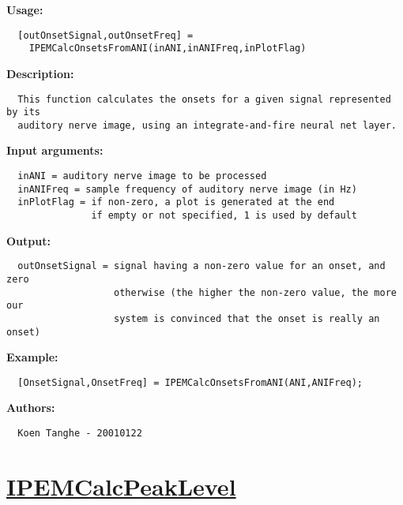 \textbf{Usage:}
\begin{verbatim}  [outOnsetSignal,outOnsetFreq] =
    IPEMCalcOnsetsFromANI(inANI,inANIFreq,inPlotFlag)

\end{verbatim}
\textbf{Description:}
\begin{verbatim}  This function calculates the onsets for a given signal represented by its 
  auditory nerve image, using an integrate-and-fire neural net layer.

\end{verbatim}
\textbf{Input arguments:}
\begin{verbatim}  inANI = auditory nerve image to be processed
  inANIFreq = sample frequency of auditory nerve image (in Hz)
  inPlotFlag = if non-zero, a plot is generated at the end
               if empty or not specified, 1 is used by default

\end{verbatim}
\textbf{Output:}
\begin{verbatim}  outOnsetSignal = signal having a non-zero value for an onset, and zero
                   otherwise (the higher the non-zero value, the more our
                   system is convinced that the onset is really an onset)

\end{verbatim}
\textbf{Example:}
\begin{verbatim}  [OnsetSignal,OnsetFreq] = IPEMCalcOnsetsFromANI(ANI,ANIFreq);

\end{verbatim}
\textbf{Authors:}
\begin{verbatim}  Koen Tanghe - 20010122
\end{verbatim}


\newpage
\section*{\hyperlink{Concepts:IPEMCalcPeakLevel}{IPEMCalcPeakLevel}}
\hypertarget{FuncRef:IPEMCalcPeakLevel}{}

